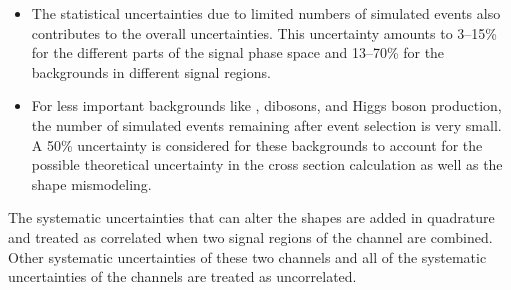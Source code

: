 \begin{itemize}
\item The statistical uncertainties due to limited numbers of simulated events also contributes to the overall uncertainties. 
This uncertainty amounts to 3--15\% for the different parts of the signal phase space and 13--70\% for the backgrounds in different signal regions.


\item For less important backgrounds like \ttbar,  dibosons, and Higgs boson production, the number of simulated events remaining after event selection is very small. 
A 50\% uncertainty is considered for these backgrounds to account for the possible theoretical uncertainty in the
cross section calculation as well as the shape mismodeling.
\end{itemize}


\noindent The systematic uncertainties that can alter the shapes are added in quadrature and 
treated as correlated when two signal regions of the \tauTau channel are combined. Other systematic uncertainties of these two 
channels and all of the systematic uncertainties of the \leptonTau channels are treated as uncorrelated.


